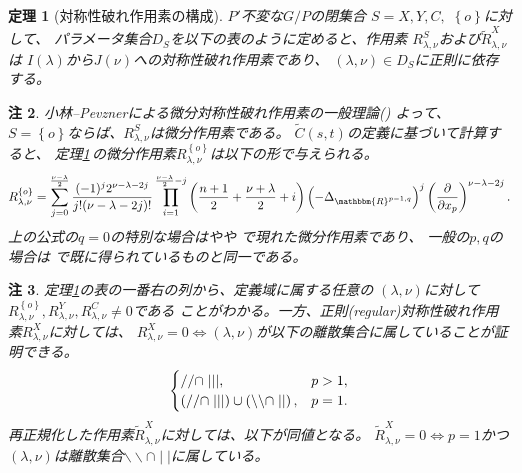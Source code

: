 \documentclass[12pt]{article} %
\newtheorem{theorem}{定理}
\newtheorem{remark}[theorem]{注}
\theoremstyle{definition}
\theoremstyle{exampstyle} \newtheorem{examp}[theorem]{Theorem}
\newcommand{\doubt}[1]{{#1}}
\begin{document}
\newpage
\begin{theorem}[対称性破れ作用素の構成]\label{thm:construction}
	{$P'$不変な$G/P$の閉集合
	$S=X,Y,C,$ $\left\{ o \right\}$に対して、
	パラメータ集合$D_S$を以下の表のように定めると、作用素
	$R_{\lambda,\nu}^S$および$\tilde{R}_{\lambda,\nu}^X$は
	$I(\lambda)$から$J(\nu)$への対称性破れ作用素であり、
$(\lambda,\nu)\in D_S$に正則に依存する}。\\
\vspace{\baselineskip}
\end{theorem}
\begin{remark}
	小林--Pevznerによる微分対称性破れ作用素の一般理論(\cite[Chap.\ 2]{kobayashi2016differential1})
	よって、
	$S=\left\{ o \right\}$ならば、$R_{\lambda,\nu}^S$は微分作用素である。
	$\tilde{C}(s,t)$の定義に基づいて計算すると、
	定理\ref{thm:construction}\,の微分作用素$R_{\lambda,\nu}^{ \left\{ o \right\}}$は以下の形で与えられる。
	\begin{equation*}
		R_{\lambda,\nu}^{ \left\{ o \right\}}=
		\sum_{j=0}^{\frac{\nu-\lambda}{2}}\frac{(-1)^j2^{\nu-\lambda-2j}}{j!(\nu-\lambda-2j)!}\prod_{i=1}^{\frac{\nu-\lambda}{2}-j}\left( \frac{n
		+1}{2}+\frac{\nu+\lambda}{2}
		+i \right)\left(- \Delta_{\mathbbm{R}^{p-1,q}} \right)^j\left( \frac{\partial}{\partial x_p} \right)^{\nu-\lambda-2j}.
	\end{equation*}
	上の公式の$q=0$の特別な場合は\cite[Thms. 5.1.1\doubt{および}5.2.1]{juhl2009families}や\cite[(10.1)]{kobayashi2015symmetry}や\cite[Thm. 6.3]{Kobayashi2016}
	で現れた微分作用素であり、
	一般の$p,q$の場合は
	\cite[Thm.\ 4.3]{kobayashi2015branching}で既に得られているものと同一である。
\end{remark}
\begin{remark}\label{rmk:thm:construction}
	定理\ref{thm:construction}\;の表の一番右の列から、定義域に{属}する任意の
	$(\lambda,\nu)$に対して$R_{\lambda,\nu}^{ \left\{ o \right\}},R_{\lambda,\nu}^Y,R_{\lambda,\nu}^C\neq0$である
	ことがわかる。一方、正則(regular)対称性破れ作用素$R_{\lambda,\nu}^X$に対しては、
	$R^X_{\lambda,\nu}=0\iff(\lambda,\nu)$が以下の離散集合に属していることが証明できる。
	\[\begin{cases}
			//\cap\mid\mid\mid,&p>1,\\
			\left(//\cap\mid\mid\mid\right) \cup \left(\backslash\backslash\cap\mid\mid\right),&p=1.
		\end{cases}
	\]
	再正規化した作用素$\tilde{R}_{\lambda,\nu}^X$に対しては{、}以下が同値となる。
	$\tilde{R}_{\lambda,\nu}^X=0\iff p=1$かつ$(\lambda,\nu)$は離散集合$\backslash\backslash\cap \mid\mid$に属している。
\end{remark}
\end{document}
